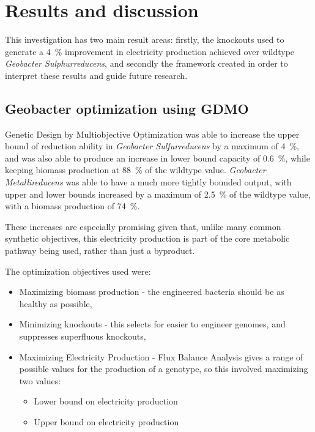 \documentclass[a4paper,twocolumn]{article}
\begin{document}
\section{Results and discussion}

This investigation has two main result areas: firstly, the knockouts used to generate a \SI{4}{\percent} improvement in electricity production achieved over wildtype {\it Geobacter Sulphurreducens}, and secondly the framework created in order to interpret these results and guide future research.

\subsection{Geobacter optimization using GDMO}
Genetic Design by Multiobjective Optimization was able to increase the upper bound of  reduction ability in {\it Geobacter Sulfurreducens} by a maximum of \SI{4}{\percent}, and was also able to produce an increase in lower bound capacity of  \SI{0.6}{\percent}, while keeping biomass production at  \SI{88}{\percent} of the wildtype value. 
{\it Geobacter Metallireducens} was able to have a much more tightly bounded output, with upper and lower bounds increased by a maximum of \SI{2.5}{\percent} of the wildtype value, with a biomass production of \SI{74}{\percent}.

These increases are especially promising given that, unlike many common synthetic objectives, this electricity production is part of the core metabolic pathway being used, rather than just a byproduct. 

The optimization objectives used were:
\begin{itemize}
	\item Maximizing biomass production - the engineered bacteria should be as healthy as possible,
	\item Minimizing knockouts - this selects for easier to engineer genomes, and suppresses superfluous knockouts,
	\item Maximizing Electricity Production - Flux Balance Analysis gives a range of possible values for the production of a genotype, so this involved maximizing two values:
	\begin{itemize}
		\item Lower bound on electricity production
		\item Upper bound on electricity production
	\end{itemize}
\end{itemize}
\end{document}
